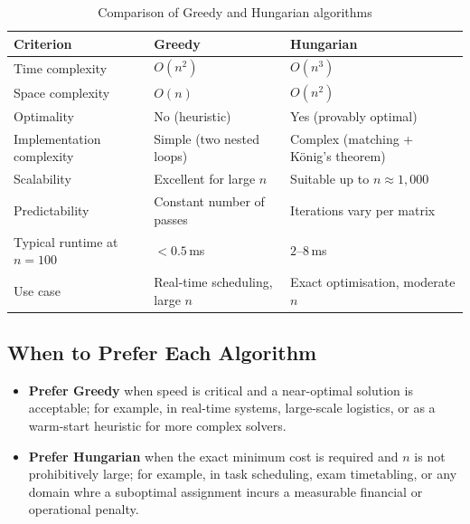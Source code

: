 \documentclass[12pt,a4paper]{article}
\begin{document}
\begin{table}[H]
    \centering
    \caption{Comparison of Greedy and Hungarian algorithms}
    \label{tab:comparison}
    \begin{tabularx}{\linewidth}{lXX}
        \toprule
        \textbf{Criterion}          & \textbf{Greedy}                     & \textbf{Hungarian}                   \\
        \midrule
        Time complexity             & $O(n^2)$                            & $O(n^3)$                             \\
        Space complexity            & $O(n)$                              & $O(n^2)$                             \\
        Optimality                  & No (heuristic)                      & Yes (provably optimal)               \\
        Implementation complexity   & Simple (two nested loops)           & Complex (matching + König's theorem) \\
        Scalability                 & Excellent for large $n$             & Suitable up to $n \approx 1{,}000$   \\
        Predictability              & Constant number of passes           & Iterations vary per matrix           \\
        Typical runtime at $n=100$  & $< 0.5$\,ms                         & $2$--$8$\,ms                         \\
        Use case                    & Real-time scheduling, large $n$     & Exact optimisation, moderate $n$     \\
        \bottomrule
    \end{tabularx}
\end{table}

\subsection{When to Prefer Each Algorithm}

\begin{itemize}
    \item \textbf{Prefer Greedy} when speed is critical and a near-optimal solution
          is acceptable; for example, in real-time systems, large-scale logistics,
          or as a warm-start heuristic for more complex solvers.
    \item \textbf{Prefer Hungarian} when the exact minimum cost is required and $n$
          is not prohibitively large; for example, in task scheduling, exam
          timetabling, or any domain whre a suboptimal assignment incurs a
          measurable financial or operational penalty.
\end{itemize}
\end{document}
